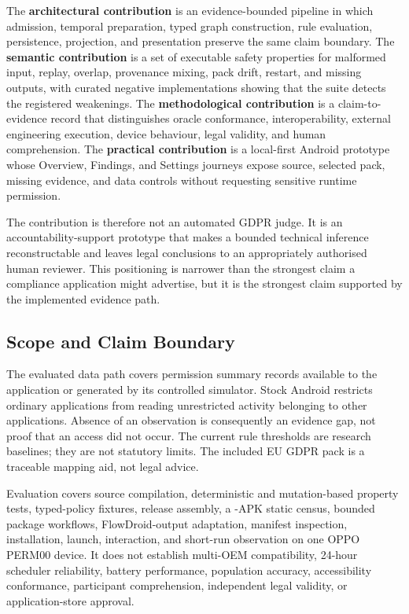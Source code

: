 The \textbf{architectural contribution} is an evidence-bounded pipeline in which admission, temporal preparation, typed graph construction, rule evaluation, persistence, projection, and presentation preserve the same claim boundary. The \textbf{semantic contribution} is a set of executable safety properties for malformed input, replay, overlap, provenance mixing, pack drift, restart, and missing outputs, with curated negative implementations showing that the suite detects the registered weakenings. The \textbf{methodological contribution} is a claim-to-evidence record that distinguishes oracle conformance, interoperability, external engineering execution, device behaviour, legal validity, and human comprehension. The \textbf{practical contribution} is a local-first Android prototype whose Overview, Findings, and Settings journeys expose source, selected pack, missing evidence, and data controls without requesting sensitive runtime permission.

The contribution is therefore not an automated GDPR judge. It is an accountability-support prototype that makes a bounded technical inference reconstructable and leaves legal conclusions to an appropriately authorised human reviewer. This positioning is narrower than the strongest claim a compliance application might advertise, but it is the strongest claim supported by the implemented evidence path.

\subsection{Scope and Claim Boundary}

The evaluated data path covers permission summary records available to the application or generated by its controlled simulator. Stock Android restricts ordinary applications from reading unrestricted activity belonging to other applications. Absence of an observation is consequently an evidence gap, not proof that an access did not occur. The current rule thresholds are research baselines; they are not statutory limits. The included EU GDPR pack is a traceable mapping aid, not legal advice.

Evaluation covers source compilation, deterministic and mutation-based property tests, typed-policy fixtures, release assembly, a \FDroidCensusN{}-APK static census, \DevicePackagesN{} bounded package workflows, FlowDroid-output adaptation, manifest inspection, installation, launch, interaction, and short-run observation on one OPPO PERM00 device. It does not establish multi-OEM compatibility, 24-hour scheduler reliability, battery performance, population accuracy, accessibility conformance, participant comprehension, independent legal validity, or application-store approval.

